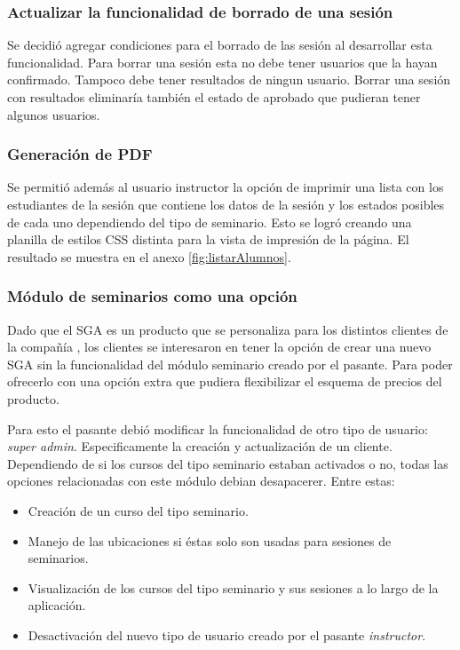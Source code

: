 \subsubsection{Actualizar la funcionalidad de borrado de una sesión}

Se decidió agregar condiciones para el borrado de las sesión al desarrollar esta funcionalidad. Para borrar una sesión esta no debe tener usuarios que la hayan confirmado. Tampoco debe tener resultados de ningun usuario. Borrar una sesión con resultados eliminaría también el estado de aprobado que pudieran tener algunos usuarios.

\subsubsection{Generación de PDF}

Se permitió además al usuario instructor la opción de imprimir una lista con los estudiantes de la sesión que contiene los datos de la sesión y los estados posibles de cada uno dependiendo del tipo de seminario. Esto se logró creando una planilla de estilos CSS distinta para la vista de impresión de la página. El resultado se muestra en el anexo \ref{fig:listarAlumnos}.


\subsubsection{Módulo de seminarios como una opción}

Dado que el SGA es un producto que se personaliza para los distintos clientes de la compañía
, los clientes se interesaron en tener la opción de crear una nuevo SGA sin la funcionalidad del módulo seminario creado por el pasante. Para poder ofrecerlo con una opción extra que pudiera flexibilizar el esquema de precios del producto.

Para esto el pasante debió modificar la funcionalidad de otro tipo de usuario: \emph{super admin}. Especificamente la creación y actualización de un cliente. Dependiendo de si los cursos del tipo seminario estaban activados o no, todas las opciones relacionadas con este módulo debian desapacerer. Entre estas:

\begin{itemize}
	\item Creación de un curso del tipo seminario.
	\item Manejo de las ubicaciones si éstas solo son usadas para sesiones de seminarios.
	\item Visualización de los cursos del tipo seminario y sus sesiones a lo largo de la aplicación.
	\item Desactivación del nuevo tipo de usuario creado por el pasante \emph{instructor}.
\end{itemize}


